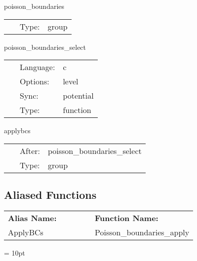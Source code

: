 \vspace{5mm}

\noindent {\bf } 

\hspace{5mm} poisson\_boundaries 

\hspace{5mm}{\it apply boundary conditions to initial data } 


\hspace{5mm}

 \begin{tabular*}{160mm}{cll} 
~ & Type:  & group \\ 
\end{tabular*} 


\vspace{5mm}


\hspace{5mm} poisson\_boundaries\_select 

\hspace{5mm}{\it select boundary conditions for initial data } 


\hspace{5mm}

 \begin{tabular*}{160mm}{cll} 
~ & Language:  & c \\ 
~ & Options:  & level \\ 
~ & Sync:  & potential \\ 
~ & Type:  & function \\ 
\end{tabular*} 


\vspace{5mm}


\hspace{5mm} applybcs 

\hspace{5mm}{\it apply boundary conditions to initial data } 


\hspace{5mm}

 \begin{tabular*}{160mm}{cll} 
~ & After:  & poisson\_boundaries\_select \\ 
~ & Type:  & group \\ 
\end{tabular*} 


\subsection*{Aliased Functions}

\hspace{5mm}

 \begin{tabular*}{160mm}{ll} 

{\bf Alias Name:} ~~~~~~~ & {\bf Function Name:} \\ 
ApplyBCs & Poisson\_boundaries\_apply \\ 
\end{tabular*} 



\vspace{5mm}\parskip = 10pt 

